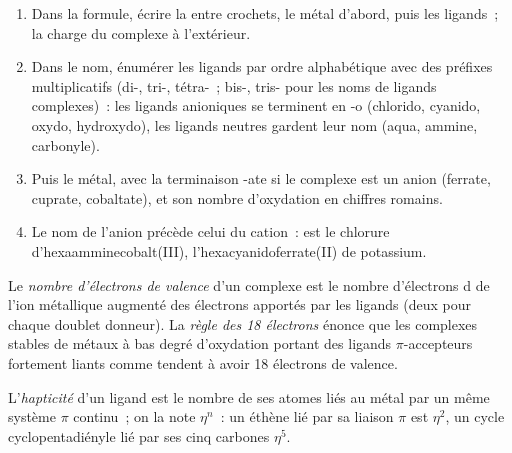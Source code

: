 \begin{method}\label{met:b2:coordination-complexes:naming}
\begin{enumerate}
  \item Dans la formule, écrire la  entre crochets, le métal
        d'abord, puis les ligands~; la charge du complexe à l'extérieur.
  \item Dans le nom, énumérer les ligands par ordre alphabétique avec des préfixes
        multiplicatifs (di-, tri-, tétra-~; bis-, tris- pour les noms de ligands complexes)~: les ligands
        anioniques se terminent en -o (chlorido, cyanido, oxydo, hydroxydo), les ligands neutres gardent
        leur nom (aqua, ammine, carbonyle).
  \item Puis le métal, avec la terminaison -ate si le complexe est un anion (ferrate,
        cuprate, cobaltate), et son nombre d'oxydation en chiffres romains.
  \item Le nom de l'anion précède celui du cation~:  est le
        chlorure d'hexaamminecobalt(III),  l'hexacyanidoferrate(II) de
        potassium.
\end{enumerate}
\end{method}

\begin{definition}\label{def:b2:coordination-complexes:electron-count}
Le \emph{nombre d'électrons de valence} d'un complexe est le
nombre d'électrons d de l'ion métallique augmenté des électrons apportés par les ligands (deux
pour chaque doublet donneur). La \emph{règle des 18 électrons} énonce que
les complexes stables de métaux à bas degré d'oxydation portant des ligands $\pi$-accepteurs
fortement liants comme  tendent à avoir 18 électrons de valence.
\end{definition}

\begin{definition}[Hapticité]\label{def:b2:coordination-complexes:hapticity}
L'\emph{hapticité} d'un ligand est le nombre de ses atomes liés au
métal par un même système $\pi$ continu~; on la note $\eta^n$~: un éthène lié par
sa liaison $\pi$ est $\eta^2$, un cycle cyclopentadiényle lié par ses cinq carbones $\eta^5$.
\end{definition}

